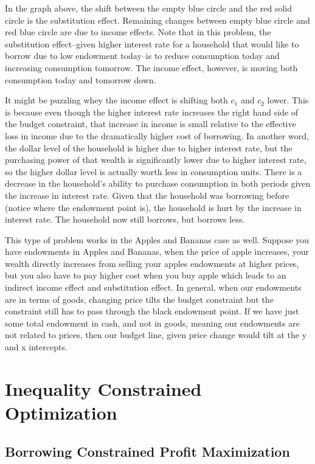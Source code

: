\documentclass[
]{book}
\begin{document}
In the graph above, the shift between the empty blue circle and the red
solid circle is the substitution effect. Remaining changes between empty
blue circle and red blue circle are due to income effects. Note that in
this problem, the substitution effect--given higher interest rate for a
household that would like to borrow due to low endowment today--is to
reduce consumption today and increasing consumption tomorrow. The income
effect, however, is moving both consumption today and tomorrow down.

It might be puzzling whey the income effect is shifting both \(c_1\) and
\(c_2\) lower. This is because even though the higher interest rate
increases the right hand side of the budget constraint, that increase in
income is small relative to the effective loss in income due to the
dramatically higher cost of borrowing. In another word, the dollar level
of the household is higher due to higher interest rate, but the
purchasing power of that wealth is significantly lower due to higher
interest rate, so the higher dollar level is actually worth less in
consumption units. There is a decrease in the household's ability to
purchase consumption in both periods given the increase in interest
rate. Given that the household was borrowing before (notice where the
endowment point is), the household is hurt by the increase in interest
rate. The household now still borrows, but borrows less.

This type of problem works in the Apples and Bananas case as well.
Suppose you have endowments in Apples and Bananas, when the price of
apple increases, your wealth directly increases from selling your apples
endowments at higher prices, but you also have to pay higher cost when
you buy apple which leads to an indirect income effect and substitution
effect. In general, when our endowments are in terms of goods, changing
price tilts the budget constraint but the constraint still has to pass
through the black endowment point. If we have just some total endowment
in cash, and not in goods, meaning our endowments are not related to
prices, then our budget line, given price change would tilt at the y and
x intercepts.

\hypertarget{inequality-constrained-optimization}{%
\chapter{Inequality Constrained Optimization}\label{inequality-constrained-optimization}}

\hypertarget{borrowing-constrained-profit-maximization}{%
\section{Borrowing Constrained Profit Maximization}\label{borrowing-constrained-profit-maximization}}
\end{document}
